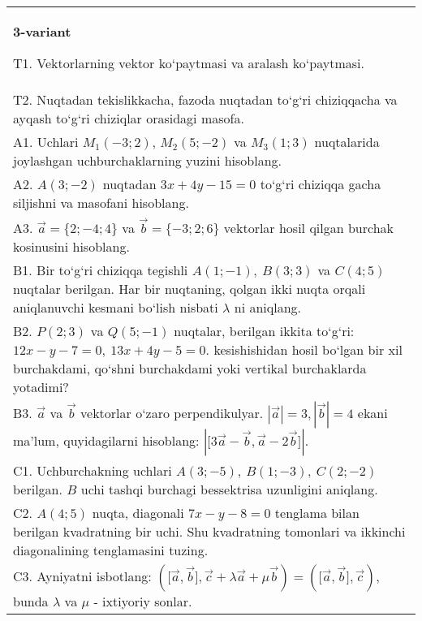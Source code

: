 \documentclass{article}
\begin{document}
\begin{tabular}{m{17cm}}
\textbf{3-variant}
\newline

T1. 
Vektorlarning vektor ko‘paytmasi va aralash ko‘paytmasi.
 \\
T2. 
Nuqtadan tekislikkacha, fazoda nuqtadan to‘g‘ri chiziqqacha va ayqash to‘g‘ri chiziqlar orasidagi masofa. \\
A1. 
Uchlari $M_1 (-3;2) $, $M_2 (5;-2) $ va $M_3 (1;3) $
nuqtalarida joylashgan uchburchaklarning yuzini hisoblang.
 \\
A2. 
$A (3;-2) $ nuqtadan $3x+4y-15=0$ to‘g‘ri chiziqqa
gacha siljishni va masofani hisoblang. \\
A3. 
$\overrightarrow{a} = \{ 2; - 4;4\}$ va $\overrightarrow{b} = \{ - 3;2;6\}$
vektorlar hosil qilgan burchak kosinusini hisoblang.
 \\
B1. 
Bir to‘g‘ri chiziqqa tegishli \(A (1;-1),\ B (3;3) \) va
\(C (4;5) \) nuqtalar berilgan. Har bir nuqtaning, qolgan ikki nuqta orqali aniqlanuvchi kesmani bo‘lish nisbati $\lambda$ ni aniqlang.
 \\
B2. 
\(P (2;3) \) va \(Q (5;-1) \) nuqtalar, berilgan ikkita
to‘g‘ri: $12x-y-7=0,\ 13x+4y-5=0$.
kesishishidan hosil bo‘lgan bir xil burchakdami, qo‘shni burchakdami yoki vertikal
burchaklarda yotadimi?
 \\
B3. 
$\vec{a}$ va $\vec{b}$ vektorlar o‘zaro perpendikulyar. $|\vec{a}| = 3,|\vec{b}| = 4$ ekani ma’lum, quyidagilarni hisoblang:
$|\lbrack 3\vec{a} - \vec{b},\vec{a}-2\vec{b}\rbrack|$.
 \\
C1. 
Uchburchakning uchlari
\(A (3; - 5),\ B (1; - 3),\ C (2; - 2) \) berilgan. $B$ uchi tashqi
burchagi bessektrisa uzunligini aniqlang.
 \\
C2. 
\(A (4;5) \) nuqta, diagonali \(7x - y - 8 = 0\) tenglama
bilan berilgan kvadratning bir uchi. Shu kvadratning tomonlari va
ikkinchi diagonalining tenglamasini tuzing.
 \\
C3. 
Ayniyatni isbotlang: \((\lbrack\vec{a},\vec{b}\rbrack,\vec{c} + \lambda\vec{a} + \mu\vec{b}) = (\lbrack\vec{a},\vec{b}\rbrack,\vec{c}) \), bunda \(\lambda\) va \(\mu\) - ixtiyoriy sonlar. \\

\end{tabular}
\vspace{1cm}
\end{document}
